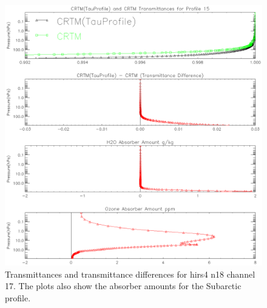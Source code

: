 \begin{figure}[htp]
  \centering{}
  \includegraphics[scale=0.8]{./graphics/Transmittance_Comparison_ch17_P15.eps}
  \caption{Transmittances and transmittance differences for hirs4 n18 channel 17. The plots also show the absorber amounts
  for the Subarctic profile.}
  \label{fig:Transmittances_Subarctic_ch17}
\end{figure}






%
%
%
%
%
%  




